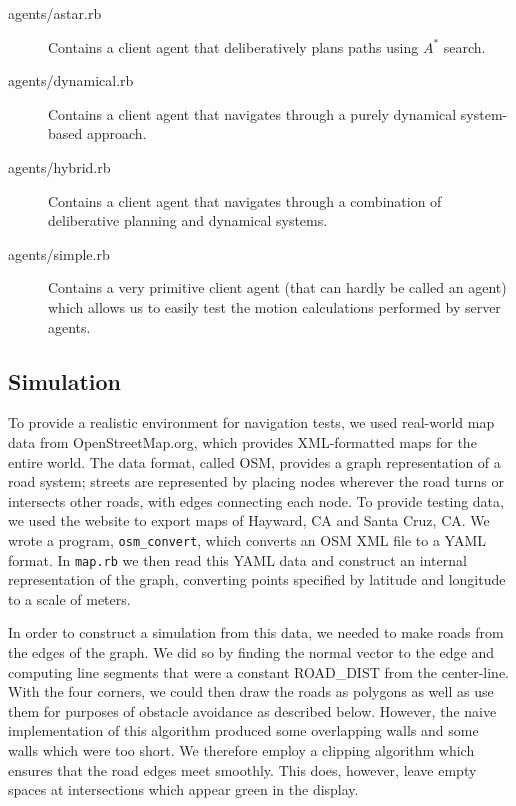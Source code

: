 \documentclass{article}
\newcommand{\code}{\texttt}
\begin{document}
\begin{description}
\item[agents/astar.rb] Contains a client agent that deliberatively
  plans paths using $A^*$ search.

\item[agents/dynamical.rb] Contains a client agent that navigates
  through a purely dynamical system-based approach.

\item[agents/hybrid.rb] Contains a client agent that navigates through
  a combination of deliberative planning and dynamical systems.

\item[agents/simple.rb] Contains a very primitive client agent (that
  can hardly be called an agent) which allows us to easily test the
  motion calculations performed by server agents.

\end{description}

\subsection{Simulation}
To provide a realistic environment for navigation tests, we used
real-world map data from OpenStreetMap.org, which provides
XML-formatted maps for the entire world. The data format, called OSM,
provides a graph representation of a road system; streets are
represented by placing nodes wherever the road turns or intersects
other roads, with edges connecting each node. To provide testing data,
we used the website to export maps of Hayward, CA and Santa Cruz,
CA. We wrote a program, \code{osm\_convert}, which converts an OSM XML
file to a YAML format. In \code{map.rb} we then read this YAML data
and construct an internal representation of the graph, converting
points specified by latitude and longitude to a scale of meters.

In order to construct a simulation from this data, we needed to make
roads from the edges of the graph. We did so by finding the normal
vector to the edge and computing line segments that were a constant
ROAD\_DIST from the center-line. With the four corners, we could then
draw the roads as polygons as well as use them for purposes of
obstacle avoidance as described below. However, the naive
implementation of this algorithm produced some overlapping walls and
some walls which were too short. We therefore employ a clipping
algorithm which ensures that the road edges meet smoothly. This does,
however, leave empty spaces at intersections which appear green in the
display.
\end{document}
